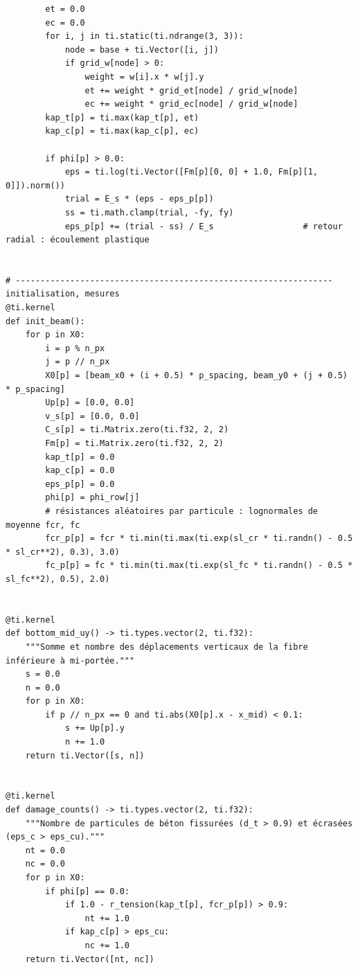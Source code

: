 \documentclass[11pt,a4paper]{article}
\begin{document}
\begin{lstlisting}
        et = 0.0
        ec = 0.0
        for i, j in ti.static(ti.ndrange(3, 3)):
            node = base + ti.Vector([i, j])
            if grid_w[node] > 0:
                weight = w[i].x * w[j].y
                et += weight * grid_et[node] / grid_w[node]
                ec += weight * grid_ec[node] / grid_w[node]
        kap_t[p] = ti.max(kap_t[p], et)
        kap_c[p] = ti.max(kap_c[p], ec)

        if phi[p] > 0.0:
            eps = ti.log(ti.Vector([Fm[p][0, 0] + 1.0, Fm[p][1, 0]]).norm())
            trial = E_s * (eps - eps_p[p])
            ss = ti.math.clamp(trial, -fy, fy)
            eps_p[p] += (trial - ss) / E_s                  # retour radial : écoulement plastique


# ---------------------------------------------------------------- initialisation, mesures
@ti.kernel
def init_beam():
    for p in X0:
        i = p % n_px
        j = p // n_px
        X0[p] = [beam_x0 + (i + 0.5) * p_spacing, beam_y0 + (j + 0.5) * p_spacing]
        Up[p] = [0.0, 0.0]
        v_s[p] = [0.0, 0.0]
        C_s[p] = ti.Matrix.zero(ti.f32, 2, 2)
        Fm[p] = ti.Matrix.zero(ti.f32, 2, 2)
        kap_t[p] = 0.0
        kap_c[p] = 0.0
        eps_p[p] = 0.0
        phi[p] = phi_row[j]
        # résistances aléatoires par particule : lognormales de moyenne fcr, fc
        fcr_p[p] = fcr * ti.min(ti.max(ti.exp(sl_cr * ti.randn() - 0.5 * sl_cr**2), 0.3), 3.0)
        fc_p[p] = fc * ti.min(ti.max(ti.exp(sl_fc * ti.randn() - 0.5 * sl_fc**2), 0.5), 2.0)


@ti.kernel
def bottom_mid_uy() -> ti.types.vector(2, ti.f32):
    """Somme et nombre des déplacements verticaux de la fibre inférieure à mi-portée."""
    s = 0.0
    n = 0.0
    for p in X0:
        if p // n_px == 0 and ti.abs(X0[p].x - x_mid) < 0.1:
            s += Up[p].y
            n += 1.0
    return ti.Vector([s, n])


@ti.kernel
def damage_counts() -> ti.types.vector(2, ti.f32):
    """Nombre de particules de béton fissurées (d_t > 0.9) et écrasées (eps_c > eps_cu)."""
    nt = 0.0
    nc = 0.0
    for p in X0:
        if phi[p] == 0.0:
            if 1.0 - r_tension(kap_t[p], fcr_p[p]) > 0.9:
                nt += 1.0
            if kap_c[p] > eps_cu:
                nc += 1.0
    return ti.Vector([nt, nc])



\end{lstlisting}
\end{document}
